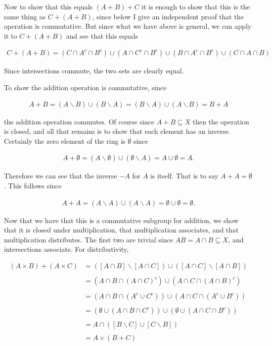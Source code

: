 \documentclass{article}
\begin{document}
  Now to show that this equals $(A+B)+C$ it is enough to show that this is the same thing as $C+(A+B)$, since below I give an independent proof that the operation is commutative.  But since what we have above is general, we can apply it to $C+(A+B)$ and see that this equals

  \begin{align*}
    C+(A+B) = (C\cap A^c\cap B^c) \cup (A\cap C^c\cap B^c) \cup (B\cap A^c\cap B^c) \cup (C\cap A\cap B)
  \end{align*}

  Since intersections commute, the two sets are clearly equal.

  To show the addition operation is commutative, since

  \begin{align*}
    A+B = (A\smallsetminus B)\cup (B\smallsetminus A) = (B\smallsetminus A)\cup (A\smallsetminus B) = B+A
  \end{align*}

  the addition operation commutes.  Of course since $A+B \subseteq X$ then the operation is closed, and all that remains is to show that each element has an inverse.  Certainly the zero element of the ring is $\emptyset$ since

  \begin{align*}
    A+\emptyset = (A\smallsetminus\emptyset)\cup(\emptyset\smallsetminus A) = A\cup \emptyset = A.
  \end{align*}

  Therefore we can see that the inverse $-A$ for $A$ is itself.  That is to say $A+A=\emptyset$.  This follows since

  \begin{align*}
    A+A = (A\smallsetminus A) \cup (A\smallsetminus A) = \emptyset \cup \emptyset = \emptyset.
  \end{align*}

  Now that we have that this is a commutative subgroup for addition, we show that it is closed under multiplication, that multiplication associates, and that multiplication distributes.  The first two are trivial since $AB = A\cap B \subseteq X$, and intersections associate.  For distributivity,

  \begin{align*}
    (A\times B)+(A\times C) &= ([A\cap B]\smallsetminus [A\cap C]) \cup ([A\cap C]\smallsetminus [A\cap B]) \\\\
    &= (A\cap B\cap (A\cap C)^c) \cup (A\cap C\cap (A\cap B)^c) \\\\
    &= (A\cap B\cap (A^c\cup C^c)) \cup (A\cap C\cap (A^c\cup B^c)) \\\\
    &= (\emptyset \cup (A\cap B\cap C^c))\cup (\emptyset \cup (A\cap C\cap B^c)) \\\\
    &= A\cap ([B \smallsetminus C] \cup [C\smallsetminus B]) \\\\
    &= A\times (B+C)
  \end{align*}
\end{document}
